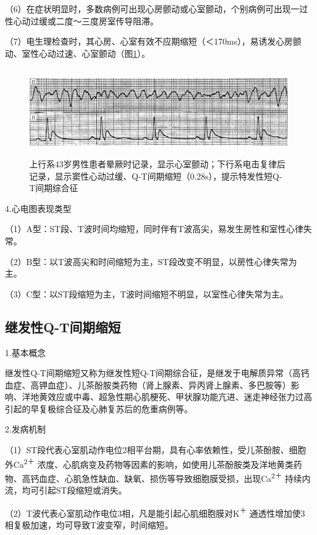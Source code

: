 （6）在症状明显时，多数病例可出现心房颤动或心室颤动，个别病例可出现一过性心动过缓或二度～三度房室传导阻滞。

（7）电生理检查时，其心房、心室有效不应期缩短（＜170ms），易诱发心房颤动、室性心动过速、心室颤动（图\ref{fig7-4}）。

\begin{figure}[!htbp]
 \centering
 \includegraphics[width=5.78125in,height=1.48958in]{./images/Image00117.jpg}
 \captionsetup{justification=centering}
 \caption{上行系43岁男性患者晕厥时记录，显示心室颤动；下行系电击复律后记录，显示窦性心动过缓、Q-T间期缩短（0.28s），提示特发性短Q-T间期综合征}
 \label{fig7-4}
  \end{figure} 

4.心电图表现类型

（1）A型：ST段、T波时间均缩短，同时伴有T波高尖，易发生房性和室性心律失常。

（2）B型：以T波高尖和时间缩短为主，ST段改变不明显，以房性心律失常为主。

（3）C型：以ST段缩短为主，T波时间缩短不明显，以室性心律失常为主。

\protect\hypertarget{text00013.htmlux5cux23subid106}{}{}

\subsection{继发性Q-T间期缩短}

1.基本概念

继发性Q-T间期缩短又称为继发性短Q-T间期综合征，是继发于电解质异常（高钙血症、高钾血症）、儿茶酚胺类药物（肾上腺素、异丙肾上腺素、多巴胺等）影响、洋地黄效应或中毒、超急性期心肌梗死、甲状腺功能亢进、迷走神经张力过高引起的早复极综合征及心肺复苏后的危重病例等。

2.发病机制

（1）ST段代表心室肌动作电位2相平台期，具有心率依赖性，受儿茶酚胺、细胞外Ca\textsuperscript{2＋}
浓度、心肌病变及药物等因素的影响，如使用儿茶酚胺类及洋地黄类药物、高钙血症、心肌急性缺血、缺氧、损伤等导致细胞膜受损，出现Ca\textsuperscript{2＋}
持续内流，均可引起ST段缩短或消失。

（2）T波代表心室肌动作电位3相，凡是能引起心肌细胞膜对K\textsuperscript{＋}
通透性增加使3相复极加速，均可导致T波变窄，时间缩短。

